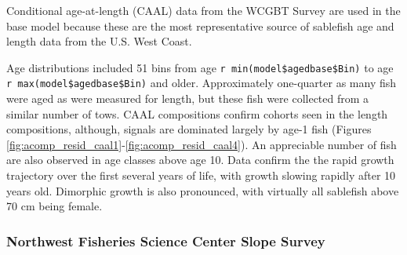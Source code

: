 \documentclass[11pt,
  english,
  a4paper,
]{article}
\begin{document}

Conditional age-at-length (CAAL) data from the WCGBT Survey are used in the base model because these are the most representative source of sablefish age and length data from the U.S. West Coast.

\leavevmode\tagmcend\tagstructend\par


Age distributions included 51 bins from age \texttt{r\ min(model\$agedbase\$Bin)} to age \texttt{r\ max(model\$agedbase\$Bin)} and older. Approximately one-quarter as many fish were aged as were measured for length, but these fish were collected from a similar number of tows. CAAL compositions confirm cohorts seen in the length compositions, although, signals are dominated largely by age-1 fish (Figures \ref{fig:acomp_resid_caal1}-\ref{fig:acomp_resid_caal4}). An appreciable number of fish are also observed in age classes above age 10. Data confirm the the rapid growth trajectory over the first several years of life, with growth slowing rapidly after 10 years old. Dimorphic growth is also pronounced, with virtually all sablefish above 70 cm being female.

\leavevmode\tagmcend\tagstructend\par


\hypertarget{northwest-fisheries-science-center-slope-survey}{%
\subsubsection{Northwest Fisheries Science Center Slope Survey}\label{northwest-fisheries-science-center-slope-survey}}

\leavevmode\tagmcend\tagstructend

\end{document}
